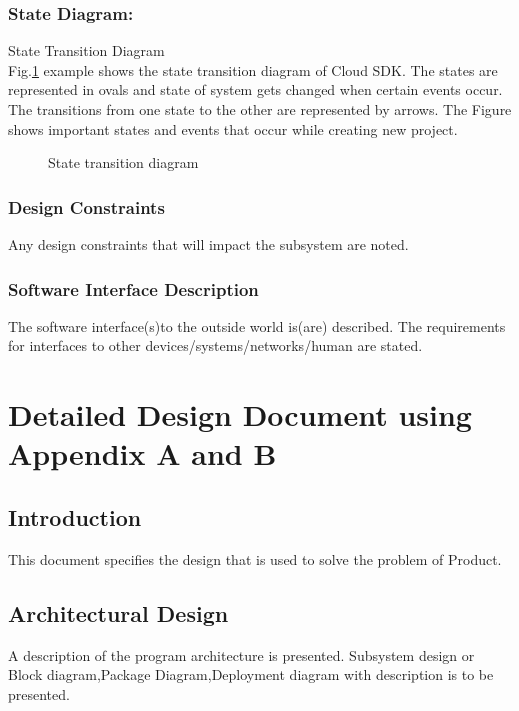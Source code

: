 \documentclass[oneside,a4paper,12pt]{report}
\begin{document}
\subsection{State Diagram:}	
  State Transition Diagram\\
Fig.\ref{fig:state-dig} example shows the state transition diagram of Cloud SDK. The states are
represented in ovals and state of system gets changed when certain events occur. The transitions from one state to the other are represented by arrows. The Figure    shows important states and events that occur while creating new project.

\begin{center}
	\begin{figure}[!htbp]
		\centering
	  \caption{State transition diagram}
	  \label{fig:state-dig}
	\end{figure}
\end{center} 
 
 \subsection{Design Constraints}	
Any design constraints that will impact the subsystem are noted.
 \subsection{Software Interface Description}	 
The software interface(s)to the outside world is(are) described.
The requirements for interfaces to other devices/systems/networks/human are stated.



\chapter{Detailed Design Document using Appendix A and B}
 \section{Introduction}  
This document specifies the design that is used to solve the problem of Product.  
\section{Architectural Design}  
	A description of the program architecture is presented. Subsystem design or Block diagram,Package Diagram,Deployment diagram with description is to be presented.
\end{document}

